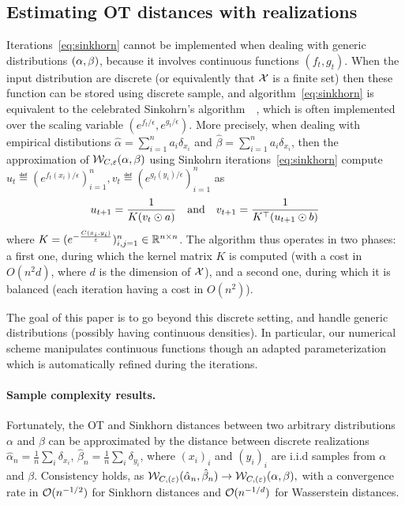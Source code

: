 \subsection{Estimating OT distances with realizations}

Iterations~\eqref{eq:sinkhorn} cannot be implemented when dealing with generic distributions $(\alpha,\beta)$, because it involves continuous functions $(f_t,g_t)$. 
%
When the input distribution are discrete (or equivalently that $\mathcal{X}$ is a finite set) then these function can be stored using discrete sample, and algorithm~\eqref{eq:sinkhorn} is equivalent to the celebrated Sinkohrn's algorithm~~\cite{Sinkhorn64,sinkhorn1967concerning}, which is often implemented over the scaling variable $(e^{f_t/\epsilon},e^{g_t/\epsilon})$.
%
More precisely, when dealing with empirical distibutions $\hat \alpha = \sum_{i=1}^n a_i \delta_{x_i}$ and $\hat \beta =
\sum_{i=1}^n a_i \delta_{x_i}$, then the approximation of $\mathcal{W}_{C,\varepsilon}(\alpha, \beta)$ using Sinkohrn iterations~\eqref{eq:sinkhorn} compute $u_t \eqdef (e^{f_t(x_i)/\epsilon})_{i=1}^n, v_t \eqdef (e^{g_t(y_i)/\epsilon})_{i=1}^n$ as
\begin{equation*}
	u_{t+1} = \frac{1}{ K (v_t \odot a) }
	\quad \text{and} \quad
	v_{t+1} = \frac{1}{ K^\top (u_{t+1} \odot b) }
\end{equation*}
where $K=(e^{-\frac{C(x_i,y_i)}{\varepsilon}})_{i,j=1}^n \in \mathbb{R}^{n \times n}$. The
algorithm thus operates in two phases: a first one, during which the kernel
matrix $K$ is computed (with a cost in $O(n^2 d)$, where $d$ is the dimension of
$\mathcal{X}$), and a second one, during which it is balanced (each iteration having a
cost in $O(n^2)$).

The goal of this paper is to go beyond this discrete setting, and handle generic distributions (possibly having continuous densities). In particular, our numerical scheme manipulates continuous functions though an adapted parameterization which is automatically refined during the iterations.



\paragraph{Sample complexity results.} Fortunately, the OT and Sinkhorn distances between two arbitrary distributions
$\alpha$ and $\beta$ can be approximated by the distance between discrete
realizations $\hat \alpha_n = \frac{1}{n} \sum_i \delta_{x_i}$, 
$\hat \beta_n = \frac{1}{n} \sum_i \delta_{y_i}$, where $(x_i)_i$
and $(y_i)_i$ are i.i.d samples from $\alpha$ and $\beta$. Consistency holds, as
$\mathcal{W}_{C, (\varepsilon)}(\hat \alpha_n, \hat \beta_n) \to \mathcal{W}_{C, (\varepsilon)}(\alpha, \beta),$
with a convergence rate in $\mathcal{O}(n^{-1/2})$ for Sinkhorn distances and $\mathcal{O}(n^{-1/d})$ for
Wasserstein distances.

